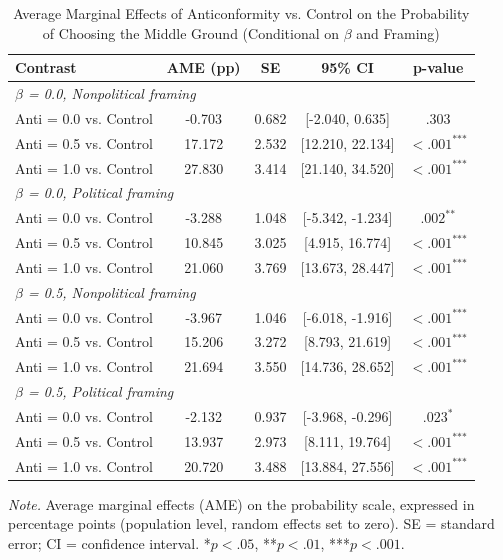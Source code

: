 \begin{table}[H]
\centering
\caption{Average Marginal Effects of Anticonformity vs. Control on the Probability of Choosing the Middle Ground (Conditional on $\beta$ and Framing)}
\label{tab:ame_anti_cond}
\begingroup
\footnotesize
\renewcommand{\arraystretch}{0.90}

\begin{tabularx}{\linewidth}{Xcccc}
\toprule
\textbf{Contrast} & \textbf{AME (pp)} & \textbf{SE} & \textbf{95\% CI} & \textbf{p-value} \\
\midrule
\multicolumn{5}{l}{\textit{$\beta$ = 0.0, Nonpolitical framing}} \\
Anti = 0.0 vs. Control & -0.703 & 0.682 & [-2.040, 0.635] & .303 \\
Anti = 0.5 vs. Control & 17.172 & 2.532 & [12.210, 22.134] & $< .001^{\text{***}}$ \\
Anti = 1.0 vs. Control & 27.830 & 3.414 & [21.140, 34.520] & $< .001^{\text{***}}$ \\
\multicolumn{5}{l}{\textit{$\beta$ = 0.0, Political framing}} \\
Anti = 0.0 vs. Control & -3.288 & 1.048 & [-5.342, -1.234] & $.002^{\text{**}}$ \\
Anti = 0.5 vs. Control & 10.845 & 3.025 & [4.915, 16.774] & $< .001^{\text{***}}$ \\
Anti = 1.0 vs. Control & 21.060 & 3.769 & [13.673, 28.447] & $< .001^{\text{***}}$ \\
\multicolumn{5}{l}{\textit{$\beta$ = 0.5, Nonpolitical framing}} \\
Anti = 0.0 vs. Control & -3.967 & 1.046 & [-6.018, -1.916] & $< .001^{\text{***}}$ \\
Anti = 0.5 vs. Control & 15.206 & 3.272 & [8.793, 21.619] & $< .001^{\text{***}}$ \\
Anti = 1.0 vs. Control & 21.694 & 3.550 & [14.736, 28.652] & $< .001^{\text{***}}$ \\
\multicolumn{5}{l}{\textit{$\beta$ = 0.5, Political framing}} \\
Anti = 0.0 vs. Control & -2.132 & 0.937 & [-3.968, -0.296] & $.023^{\text{*}}$ \\
Anti = 0.5 vs. Control & 13.937 & 2.973 & [8.111, 19.764] & $< .001^{\text{***}}$ \\
Anti = 1.0 vs. Control & 20.720 & 3.488 & [13.884, 27.556] & $< .001^{\text{***}}$ \\
\bottomrule
\end{tabularx}

\vspace{0.6em}
{\footnotesize
\setlength{\baselineskip}{12pt}
\textit{Note.} Average marginal effects (AME) on the probability scale, expressed in percentage points (population level, random effects set to zero). SE = standard error; CI = confidence interval. *$p < .05$, **$p < .01$, ***$p < .001$.
\par}
\endgroup
\end{table}

